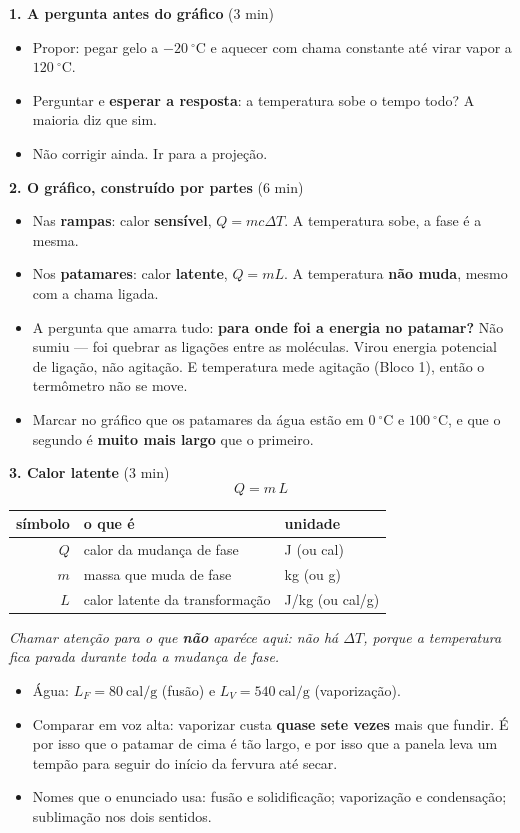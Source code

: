 \documentclass[11pt,a4paper]{article}
\makeatletter
\newcommand{\variaveis}[1]{%
  \begingroup\footnotesize
  \setlength{\tabcolsep}{6pt}
  \renewcommand{\arraystretch}{1.15}
  \begin{center}
  \begin{tabular}{@{}rll@{}}
    \toprule
    \textbf{s\'imbolo} & \textbf{o que \'e} & \textbf{unidade} \\
    \midrule
    #1
    \bottomrule
  \end{tabular}
  \end{center}
  \endgroup}
\makeatother
\begin{document}
\begin{quadro}
\textbf{1. A pergunta antes do gr\'afico} (3 min)
\begin{itemize}[nosep]
  \item Propor: pegar gelo a $-20\ ^\circ$C e aquecer com chama constante
        at\'e virar vapor a $120\ ^\circ$C.
  \item Perguntar e \textbf{esperar a resposta}: a temperatura sobe o
        tempo todo? A maioria diz que sim.
  \item N\~ao corrigir ainda. Ir para a proje\c{c}\~ao.
\end{itemize}

\medskip
\textbf{2. O gr\'afico, constru\'ido por partes} (6 min)
\begin{itemize}[nosep]
  \item Nas \textbf{rampas}: calor \textbf{sens\'ivel}, $Q = mc\Delta T$.
        A temperatura sobe, a fase \'e a mesma.
  \item Nos \textbf{patamares}: calor \textbf{latente}, $Q = mL$. A
        temperatura \textbf{n\~ao muda}, mesmo com a chama ligada.
  \item A pergunta que amarra tudo: \textbf{para onde foi a energia no
        patamar?} N\~ao sumiu --- foi quebrar as liga\c{c}\~oes entre as
        mol\'eculas. Virou energia potencial de liga\c{c}\~ao, n\~ao agita\c{c}\~ao. E
        temperatura mede agita\c{c}\~ao (Bloco 1), ent\~ao o term\^ometro n\~ao se
        move.
  \item Marcar no gr\'afico que os patamares da \'agua est\~ao em
        $0\ ^\circ$C e $100\ ^\circ$C, e que o segundo \'e \textbf{muito
        mais largo} que o primeiro.
\end{itemize}

\medskip
\textbf{3. Calor latente} (3 min)
\[
  \boxed{Q = m\,L}
\]
\variaveis{
  $Q$ & calor da mudan\c{c}a de fase & J (ou cal) \\
  $m$ & massa que muda de fase       & kg (ou g) \\
  $L$ & calor latente da transforma\c{c}\~ao & J/kg (ou cal/g) \\
}
\nopagebreak
{\itshape\color{grafite}Chamar aten\c{c}\~ao para o que \textbf{n\~ao}
apar\'ece aqui: n\~ao h\'a $\Delta T$, porque a temperatura fica parada
durante toda a mudan\c{c}a de fase.\par}
\begin{itemize}[nosep]
  \item \'Agua: $L_F = 80\ \text{cal/g}$ (fus\~ao) e
        $L_V = 540\ \text{cal/g}$ (vaporiza\c{c}\~ao).
  \item Comparar em voz alta: vaporizar custa \textbf{quase sete vezes}
        mais que fundir. \'E por isso que o patamar de cima \'e t\~ao largo, e
        por isso que a panela leva um temp\~ao para seguir do in\'icio da
        fervura at\'e secar.
  \item Nomes que o enunciado usa: fus\~ao e solidifica\c{c}\~ao; vaporiza\c{c}\~ao e
        condensa\c{c}\~ao; sublima\c{c}\~ao nos dois sentidos.
\end{itemize}


\end{quadro}
\end{document}
